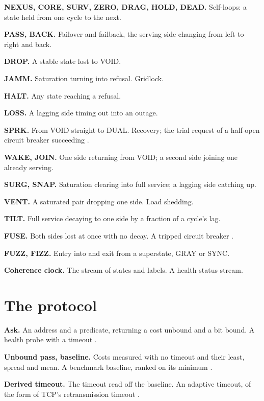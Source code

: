 \noindent\textbf{NEXUS, CORE, SURV, ZERO, DRAG, HOLD, DEAD.} Self-loops: a state held from one
cycle to the next.

\noindent\textbf{PASS, BACK.} Failover and failback, the serving side changing from left to right
and back.

\noindent\textbf{DROP.} A stable state lost to VOID.

\noindent\textbf{JAMM.} Saturation turning into refusal. Gridlock.

\noindent\textbf{HALT.} Any state reaching a refusal.

\noindent\textbf{LOSS.} A lagging side timing out into an outage.

\noindent\textbf{SPRK.} From VOID straight to DUAL. Recovery; the trial request of a half-open
circuit breaker succeeding \cite{src:Nygard}.

\noindent\textbf{WAKE, JOIN.} One side returning from VOID; a second side joining one already
serving.

\noindent\textbf{SURG, SNAP.} Saturation clearing into full service; a lagging side catching up.

\noindent\textbf{VENT.} A saturated pair dropping one side. Load shedding.

\noindent\textbf{TILT.} Full service decaying to one side by a fraction of a cycle's lag.

\noindent\textbf{FUSE.} Both sides lost at once with no decay. A tripped circuit breaker
\cite{src:Nygard}.

\noindent\textbf{FUZZ, FIZZ.} Entry into and exit from a superstate, GRAY or SYNC.

\noindent\textbf{Coherence clock.} The stream of states and labels. A health status stream.

\section{The protocol}

\noindent\textbf{Ask.} An address and a predicate, returning a cost unbound and a bit bound. A
health probe with a timeout \cite{src:Kubernetes-probes}.

\noindent\textbf{Unbound pass, baseline.} Costs measured with no timeout and their least, spread
and mean. A benchmark baseline, ranked on its minimum \cite{src:Chen-Revels}.

\noindent\textbf{Derived timeout.} The timeout read off the baseline. An adaptive timeout, of the
form of TCP's retransmission timeout \cite{src:RFC6298}.

